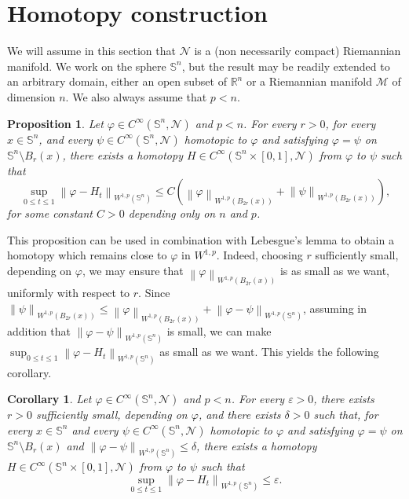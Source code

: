 \documentclass[12pt]{amsart}
\newcommand{\m}{\mathcal{M}}
\def\n{{\mathcal N}}
\def\n{{\mathcal{M}}}
\def\n{{\mathcal N}}
\def\S{{\mathbb S}}
\newtheorem{corollary}[theorem]{Corollary}
\newtheorem{proposition}[theorem]{Proposition}
\newcommand{\R}{\mathbb{R}}
\newcommand{\brac}[1]{\left (#1 \right )}
\newcommand{\norm}[1]{\left\|{#1}\right\|}
\numberwithin{theorem}{section} \numberwithin{equation}{section}
\begin{document}
\section{Homotopy construction}\label{s:homotopy}
We will assume in this section that $\n$ is a (non necessarily compact) Riemannian manifold.
We work on the sphere $ \S^n $, but the result may be readily extended to an arbitrary domain, either an open subset of $ \R^n $ or a Riemannian manifold $ \m $ of dimension $ n $.
We also always assume that $ p < n $.

\begin{proposition}
\label{proposition:controlled_homotopies}
	Let $ \varphi \in C^{\infty}(\S^n,\n)$ and $p<n$.
	For every $ r > 0 $, for every $ x \in \S^n $, and every $ \psi \in C^{\infty}(\S^n,\n)$ homotopic to $ \varphi $ and satisfying $ \varphi = \psi $ on $ \S^n \setminus B_r(x)  $, there exists a homotopy $ H \in C^{\infty}(\S^n \times [0,1],\n)$ from $ \varphi $ to $ \psi $ such that
	\[
		\sup_{0 \leq t \leq 1} \norm{\varphi - H_{t}}_{W^{1,p}(\S^n)}
		\leq
		C\brac{\norm{\varphi}_{W^{1,p}(B_{2r}(x))} + \norm{\psi}_{W^{1,p}(B_{2r}(x))}}\text{,}
	\]
	for some constant $ C > 0 $ depending only on $ n $ and $ p $.
\end{proposition}

This proposition can be used in combination with Lebesgue's lemma to obtain a homotopy which remains close to $ \varphi $ in $ W^{1,p} $.
Indeed, choosing $ r $ sufficiently small, depending on $ \varphi $, we may ensure that $ \norm{\varphi}_{W^{1,p}(B_{2r}(x))} $ is as small as we want, uniformly with respect to $ r $.
Since $ \norm{\psi}_{W^{1,p}(B_{2r}(x))} \leq \norm{\varphi}_{W^{1,p}(B_{2r}(x))} + \norm{\varphi-\psi}_{W^{1,p}(\S^n)} $, assuming in addition that $ \norm{\varphi-\psi}_{W^{1,p}(\S^n)} $ is small, we can make $ \sup_{0 \leq t \leq 1} \norm{\varphi - H_{t}}_{W^{1,p}(\S^n)} $ as small as we want. 
This yields the following corollary.

\begin{corollary}
\label{corollary:small_homotopies}
	Let $ \varphi \in C^{\infty}(\S^n,\n) $ and $p<n$.
	For every $ \varepsilon > 0 $, there exists $ r > 0 $ sufficiently small, depending on $ \varphi $, and there exists $ \delta > 0 $ such that, for every $ x \in \S^n $ and every $ \psi \in C^{\infty}(\S^n,\n) $ homotopic to $ \varphi $ and satisfying $ \varphi = \psi $ on $ \S^n \setminus B_r(x)  $ and $ \norm{\varphi-\psi}_{W^{1,p}(\S^n)} \leq \delta $, there exists a homotopy $ H \in C^{\infty}(\S^n\times[0,1],\n)$ from $ \varphi $ to $ \psi $ such that
	\[
		\sup_{0 \leq t \leq 1} \norm{\varphi - H_{t}}_{W^{1,p}(\S^n)}
		\leq
		\varepsilon\text{.}
	\]
\end{corollary}
\end{document}
